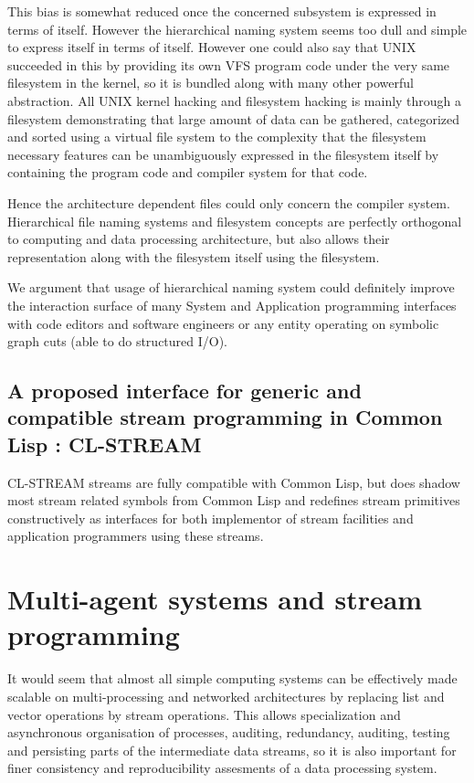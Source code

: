 \documentclass[sigconf]{acmart}
\begin{document}
This bias is somewhat reduced once the concerned subsystem is
expressed in terms of itself. However the hierarchical naming system
seems too dull and simple to express itself in terms of itself. However
one could also say that UNIX succeeded in this by providing its own
VFS program code under the very same filesystem in the kernel, so it
is bundled along with many other powerful abstraction. All UNIX kernel
hacking and filesystem hacking is mainly through a filesystem
demonstrating that large amount of data can be gathered, categorized
and sorted using a virtual file system to the complexity that the
filesystem necessary features can be unambiguously expressed in the
filesystem itself by containing the program code and compiler system
for that code.

Hence the architecture dependent files could only concern the compiler
system. Hierarchical file naming systems and filesystem concepts are
perfectly orthogonal to computing and data processing architecture,
but also allows their representation along with the filesystem itself
using the filesystem.

We argument that usage of hierarchical naming system could definitely
improve the interaction surface of many System and Application
programming interfaces with code editors and software engineers or any
entity operating on symbolic graph cuts (able to do structured I/O).


\subsection{A proposed interface for generic and compatible stream
  programming in Common Lisp : CL-STREAM}

CL-STREAM streams are fully compatible with Common Lisp, but does
shadow most stream related symbols from Common Lisp and redefines
stream primitives constructively as interfaces for both implementor of
stream facilities and application programmers using these streams.


\section{Multi-agent systems and stream programming}

It would seem that almost all simple computing systems can be
effectively made scalable on multi-processing and networked
architectures by replacing list and vector operations by stream
operations. This allows specialization and asynchronous organisation
of processes, auditing, redundancy, auditing, testing and persisting
parts of the intermediate data streams, so it is also important for
finer consistency and reproducibility assesments of a data processing
system.
\end{document}
